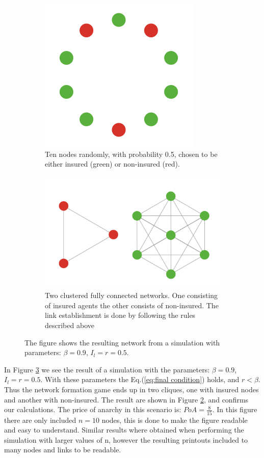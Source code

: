 \begin{figure}[h]
\centering
\begin{subfigure}{.5\textwidth}
  \centering
  \includegraphics[width=0.4\linewidth]{../Figures/FirstSimulationStart.png}
  \caption{\label{fig:firstsimulation:a} Ten nodes randomly, with probability 0.5, chosen to be either insured (green) or non-insured (red).}
\end{subfigure}
\quad
\begin{subfigure}{.46\textwidth}
  \centering
  \includegraphics[width=0.8\linewidth]{../Figures/FirstSimulationResult.png}
  \caption{\label{fig:firstsimulation:b} Two clustered fully connected networks. One consisting of insured agents the other consists of non-insured. The link establishment is done by following the rules described above}
\end{subfigure}
\caption{\label{fig:firstsimulation} The figure shows the resulting network from a simulation with parameters: $\beta=0.9$, $I_{l}=r=0.5$.}
\end{figure}
In Figure \ref{fig:firstsimulation} we see the result of a simulation with the parameters: $\beta=0.9$, $I_{l}=r=0.5$. With these parameters the Eq.(\ref{eq:final condition}) holds, and $r<\beta$. Thus the network formation game ends up in two cliques, one with insured nodes and another with non-insured. The result are shown in Figure \ref{fig:firstsimulation:b}, and confirms our calculations.
The price of anarchy in this scenario is: $PoA=\frac{8}{15}$.
In this figure there are only included $n=10$ nodes, this is done to make the figure readable and easy to understand.
Similar results where obtained when performing the simulation with larger values of n, however the resulting printouts included to many nodes and links to be readable. 

